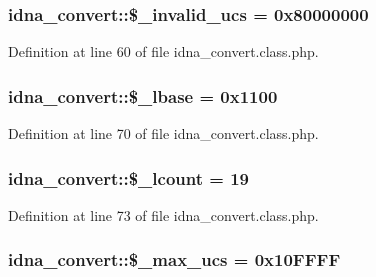 \hypertarget{classidna__convert_a741bab9cbe7aec53249d714143bbe53b}{
\subsubsection[{\$\-\_\-invalid\-\_\-ucs}]{\setlength{\rightskip}{0pt plus 5cm}idna\-\_\-convert\-::\$\-\_\-invalid\-\_\-ucs = 0x80000000\hspace{0.3cm}{\ttfamily [protected]}}}\label{classidna__convert_a741bab9cbe7aec53249d714143bbe53b}


Definition at line 60 of file idna\-\_\-convert.\-class.\-php.

\hypertarget{classidna__convert_a50c50cda465aefe78b8ed69ae6cd6247}{
\subsubsection[{\$\-\_\-lbase}]{\setlength{\rightskip}{0pt plus 5cm}idna\-\_\-convert\-::\$\-\_\-lbase = 0x1100\hspace{0.3cm}{\ttfamily [protected]}}}\label{classidna__convert_a50c50cda465aefe78b8ed69ae6cd6247}


Definition at line 70 of file idna\-\_\-convert.\-class.\-php.

\hypertarget{classidna__convert_ae191087842e21e5f56a0df02f922abbe}{
\subsubsection[{\$\-\_\-lcount}]{\setlength{\rightskip}{0pt plus 5cm}idna\-\_\-convert\-::\$\-\_\-lcount = 19\hspace{0.3cm}{\ttfamily [protected]}}}\label{classidna__convert_ae191087842e21e5f56a0df02f922abbe}


Definition at line 73 of file idna\-\_\-convert.\-class.\-php.

\hypertarget{classidna__convert_aea20377d4d2659186a1901d6a66f5d58}{
\subsubsection[{\$\-\_\-max\-\_\-ucs}]{\setlength{\rightskip}{0pt plus 5cm}idna\-\_\-convert\-::\$\-\_\-max\-\_\-ucs = 0x10\-F\-F\-F\-F\hspace{0.3cm}{\ttfamily [protected]}}}\label{classidna__convert_aea20377d4d2659186a1901d6a66f5d58}


